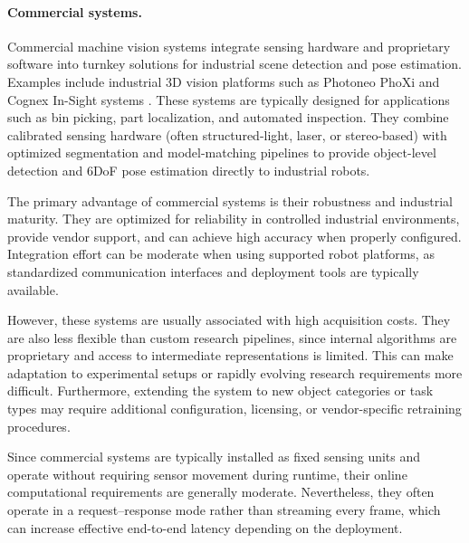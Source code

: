 \paragraph{Commercial systems.}
Commercial machine vision systems integrate sensing hardware and proprietary software into turnkey solutions for industrial scene detection and pose estimation. Examples include industrial 3D vision platforms such as Photoneo PhoXi \cite{PhotoneoWebsite} and Cognex In-Sight systems \cite{CognexWebsite}. These systems are typically designed for applications such as bin picking, part localization, and automated inspection. They combine calibrated sensing hardware (often structured-light, laser, or stereo-based) with optimized segmentation and model-matching pipelines to provide object-level detection and 6DoF pose estimation directly to industrial robots.

The primary advantage of commercial systems is their robustness and industrial maturity. They are optimized for reliability in controlled industrial environments, provide vendor support, and can achieve high accuracy when properly configured. Integration effort can be moderate when using supported robot platforms, as standardized communication interfaces and deployment tools are typically available.

However, these systems are usually associated with high acquisition costs. They are also less flexible than custom research pipelines, since internal algorithms are proprietary and access to intermediate representations is limited. This can make adaptation to experimental setups or rapidly evolving research requirements more difficult. Furthermore, extending the system to new object categories or task types may require additional configuration, licensing, or vendor-specific retraining procedures.

Since commercial systems are typically installed as fixed sensing units and operate without requiring sensor movement during runtime, their online computational requirements are generally moderate. Nevertheless, they often operate in a request–response mode rather than streaming every frame, which can increase effective end-to-end latency depending on the deployment.



